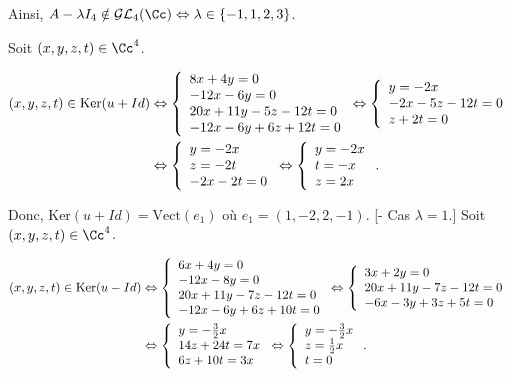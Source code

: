 {\begin{enumerate}
{Ainsi, $A-\lambda I_4\notin\mathcal{GL}_4(\Cc)\Leftrightarrow\lambda\in\{-1,1,2,3\}$.

\begin{itemize}
[- Cas $\lambda=-1$.] Soit $(x,y,z,t)\in\Cc^4$.

\begin{align*}\ensuremath
(x,y,z,t)\in\mbox{Ker}(u+Id)&\Leftrightarrow\left\{
\begin{array}{l}
8x+4y=0\\
-12x-6y=0\\
20x+11y-5z-12t=0\\
-12x-6y+6z+12t=0
\end{array}
\right.\Leftrightarrow\left\{
\begin{array}{l}
y=-2x\\
-2x-5z-12t=0\\
z+2t=0\end{array}
\right.
\\
 &\Leftrightarrow\left\{
\begin{array}{l}
y=-2x\\
z=-2t\\
-2x-2t=0
\end{array}
\right.
\Leftrightarrow
\left\{
\begin{array}{l}
y=-2x\\
t=-x\\
z=2x
\end{array}
\right..
\end{align*}

Donc, $\mbox{Ker}(u+Id)=\mbox{Vect}(e_1)$ où $e_1=(1,-2,2,-1)$.
[- Cas $\lambda=1$.]
Soit $(x,y,z,t)\in\Cc^4$.

\begin{align*}\ensuremath
(x,y,z,t)\in\mbox{Ker}(u-Id)&\Leftrightarrow\left\{
\begin{array}{l}
6x+4y=0\\
-12x-8y=0\\
20x+11y-7z-12t=0\\
-12x-6y+6z+10t=0
\end{array}
\right.\Leftrightarrow\left\{
\begin{array}{l}
3x+2y=0\\
20x+11y-7z-12t=0\\
-6x-3y+3z+5t=0
\end{array}
\right.
\\
 &\Leftrightarrow\left\{
\begin{array}{l}
y=-\frac{3}{2}x\\
14z+24t=7x\\
6z+10t=3x
\end{array}
\right.
\Leftrightarrow
\left\{
\begin{array}{l}
y=-\frac{3}{2}x\\
z=\frac{1}{2}x\\
t=0
\end{array}
\right..
\end{align*}


\end{itemize}}
\end{enumerate}}
